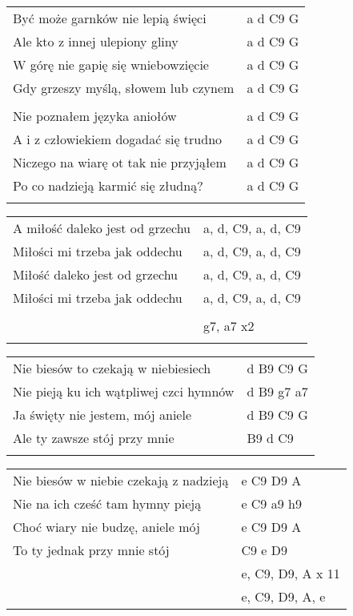 \documentclass[a5paper]{article}
\begin{document}
\noindent
\begin{tabular}{@{}p{8.00cm}p{3cm}@{}}
Być może garnków nie lepią święci & a d C9 G \\
Ale kto z innej ulepiony gliny & a d C9 G \\
W górę nie gapię się wniebowzięcie & a d C9 G \\
Gdy grzeszy myślą, słowem lub czynem & a d C9 G \\ \\

Nie poznałem języka aniołów	& a d C9 G \\
A i z człowiekiem dogadać się trudno & a d C9 G \\
Niczego na wiarę ot tak nie przyjąłem & a d C9 G \\
Po co nadzieją karmić się złudną? & a d C9 G \\ \\
\end{tabular}

\noindent
\begin{tabular}{@{}p{6.00cm}p{3cm}@{}}
A miłość daleko jest od grzechu & a, d, C9, a, d, C9 \\
Miłości mi trzeba jak oddechu & a, d, C9, a, d, C9 \\
Miłość daleko jest od grzechu & a, d, C9, a, d, C9 \\
Miłości mi trzeba jak oddechu & a, d, C9, a, d, C9 \\ \\
& g7, a7 x2 \\ \\
\end{tabular}

\noindent
\begin{tabular}{@{}p{7.00cm}p{3cm}@{}}
Nie biesów to czekają w niebiesiech & d B9 C9 G \\
Nie pieją ku ich wątpliwej czci hymnów & d B9 g7 a7 \\
Ja święty nie jestem, mój aniele & d B9 C9 G \\
Ale ty zawsze stój przy mnie & B9 d C9 \\ \\
\end{tabular}

\noindent
\begin{tabular}{@{}p{7.00cm}p{3cm}@{}}
Nie biesów w niebie czekają z nadzieją & e C9 D9 A \\
Nie na ich cześć tam hymny pieją & e C9 a9 h9 \\
Choć wiary nie budzę, aniele mój & e C9 D9 A \\
To ty jednak przy mnie stój & C9 e D9 \\
& e, C9, D9, A x 11 \\
& e, C9, D9, A, e
\end{tabular}
\end{document}
